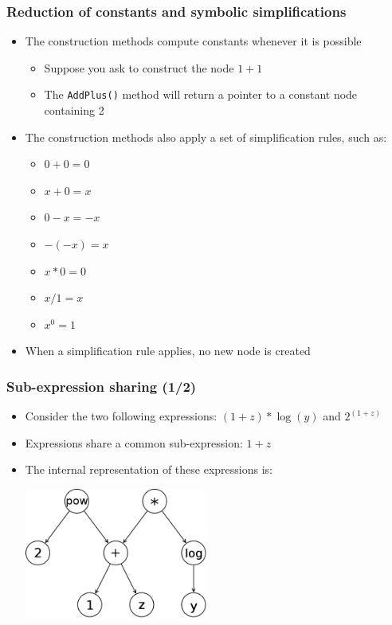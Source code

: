 \documentclass{beamer}
\begin{document}
\begin{frame}
  \frametitle{Reduction of constants and symbolic simplifications}
  \begin{itemize}
  \item The construction methods compute constants whenever it is possible
    \begin{itemize}
    \item Suppose you ask to construct the node $1+1$
    \item The \texttt{AddPlus()} method will return a pointer to a constant node containing 2
    \end{itemize}
  \item The construction methods also apply a set of simplification rules, such as:
    \begin{itemize}
    \item $0+0=0$
    \item $x+0 = x$
    \item $0-x = -x$
    \item $-(-x) = x$
    \item $x*0 = 0$
    \item $x/1 = x$
    \item $x^0 = 1$
    \end{itemize}
  \item When a simplification rule applies, no new node is created
  \end{itemize}
\end{frame}

\begin{frame}
  \frametitle{Sub-expression sharing (1/2)}
  \begin{itemize}
  \item Consider the two following expressions: $(1+z)*\log(y)$ and $2^{(1+z)}$
  \item Expressions share a common sub-expression: $1+z$
  \item The internal representation of these expressions is:
    \begin{center}
      \includegraphics[width=6cm]{expr-sharing.png}
    \end{center}
  \end{itemize}
\end{frame}
\end{document}
